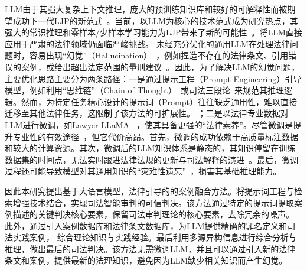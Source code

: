 LLM由于其强大复杂上下文推理，庞大的预训练知识库和较好的可解释性而被期望成功下一代LJP的新范式~\cite{wu2020de-biased,yang2023baichuan,yao2020refining}。当前，以LLM为核心的技术范式成为研究热点，其强大的常识推理和零样本/少样本学习能力为LJP带来了新的可能性~\cite{brown2020language,huang2022towards,shu2024large,wen2024review}。将LLM直接应用于严肃的法律领域仍面临严峻挑战。
未经充分优化的通用LLM在处理法律问题时，容易出现“幻觉”（Hallucination）~\cite{cui2023survey,radford2025improving,raffel2020exploring}，例如捏造不存在的法律条文、引用错误的案例，或给出超出法定范围的量刑建议~\cite{lewis2020retrieval}。因此，为了解决LLM的幻觉问题，主要优化思路主要分为两条路径：一是通过提示工程（Prompt Engineering）引导模型，例如利用“思维链”（Chain of Thought）~\cite{kojima2022large,izacard2021leveraging,rajani2019explain,talmor2019leap,wang2023self,wei2022chain}或司法三段论~\cite{huang2023lawyertrautmann2022legal,xu2023superclue,yu2022legal}来规范其推理逻辑。然而，为特定任务精心设计的提示词（Prompt）往往缺乏通用性，难以直接迁移至其他法律任务，这限制了该方法的可扩展性。
；二是以法律专业数据对LLM进行微调，如Lawyer LLaMA ~\cite{chen2020recall,yue2021circumstances}，使其具备更强的“法律素养”。尽管微调是提升专业性的有效途径~\cite{hu2021lora,hu2022lora,zelikman2024star}，但它代价高昂。首先，微调的成功依赖于高质量标注数据和较大的计算资源。其次，微调后的LLM知识体系是静态的，其知识停留在训练数据集的时间点，无法实时跟进法律法规的更新与司法解释的演进~\cite{li2021prefix,zhang2024comprehensive}。最后，微调过程还可能导致模型对其通用知识的“灾难性遗忘”~\cite{chen2020recall}，损害其基础推理能力。

因此本研究提出基于大语言模型，法律引导的的案例融合方法。将提示词工程与检索增强技术结合，实现司法智能审判的可信判决。该方法通过特定的提示词提取案例描述的关键判决核心要素，保留司法审判理论的核心要素，去除冗余的噪声。 此外，通过引入案例数据库和法律条文数据库，为LLM提供精确的罪名定义和司法实践案例， 综合理论知识与实践经验。最后利用多源异构信息进行综合分析与推理，做出最后的司法判决。该方法无需微调LLM，并且可以通过引入新的法律条文和案例，提供最新的法理知识，避免因为LLM缺少相关知识而产生幻觉。